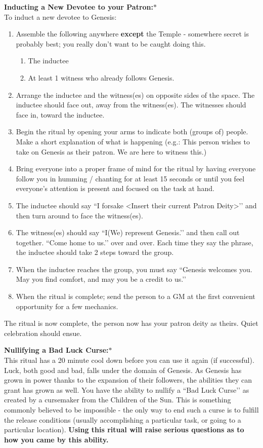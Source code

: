 \documentclass[green]{GL2020}
\begin{document}
   
\textbf{Inducting a New Devotee to your Patron:}$*$\\
To induct a new devotee to Genesis:
\begin{enumerate}
  \item Assemble the following anywhere \textbf{except} the Temple - somewhere secret is probably best; you really don’t want to be caught doing this.
  \begin{enumerate}
    \item The inductee
    \item At least 1 witness who already follows Genesis.
  \end{enumerate}
  \item Arrange the inductee and the witness(es) on opposite sides of the space. The inductee should face out, away from the witness(es). The witnesses should face in, toward the inductee.
  \item Begin the ritual by opening your arms to indicate both (groups of) people. Make a short explanation of what is happening (e.g.: This person wishes to take on Genesis as their patron. We are here to witness this.)
  \item Bring everyone into a proper frame of mind for the ritual by having everyone follow you in humming / chanting for at least 15 seconds or until you feel everyone’s attention is present and focused on the task at hand.
  \item The inductee should say ``I forsake <Insert their current Patron Deity>’’ and then turn around to face the witness(es).
  \item The witness(es) should say ``I(We) represent Genesis.’’ and then call out together. ``Come home to us.’’ over and over. Each time they say the phrase, the inductee should take 2 steps toward the group.
  \item When the inductee reaches the group, you must say ``Genesis welcomes you. May you find comfort, and may you be a credit to us.’’
  \item When the ritual is complete; send the person to a GM at the first convenient opportunity for a few mechanics.
\end{enumerate}

The ritual is now complete, the person now has your patron deity as theirs. Quiet celebration should ensue.
   
\textbf{Nullifying a Bad Luck Curse:}$*$\\
This ritual has a 20 minute cool down before you can use it again (if successful). Luck, both good and bad, falls under the domain of Genesis. As Genesis has grown in power thanks to the expansion of their followers, the abilities they can grant has grown as well. You have the ability to nullify a ``Bad Luck Curse’’ as created by a cursemaker from the Children of the Sun. This is something commonly believed to be impossible - the only way to end such a curse is to fulfill the release conditions (usually accomplishing a particular task, or going to a particular location). \textbf{Using this ritual will raise serious questions as to how you came by this ability.}
\end{document}
